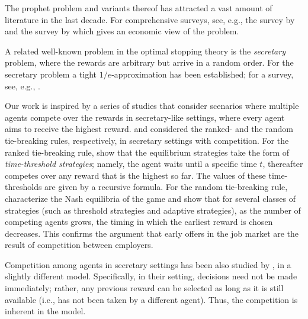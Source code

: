 The prophet problem and variants thereof has attracted a vast amount of literature in the last decade. For comprehensive surveys, see, e.g., the survey by %
\citet{hill1992survey} and the survey by %
\citet{lucier2017economic} which gives an economic view of the problem. 

A related well-known problem in the optimal stopping theory is the {\em secretary} problem, where the rewards are arbitrary but arrive in a random order. For the secretary problem a tight $1/e$-approximation has been established; for a survey, see, e.g., \cite{Ferguson89whosolved}.

Our work is inspired by a series of studies that consider scenarios where multiple agents compete over the rewards in secretary-like settings, where every agent aims to receive the highest reward.
\citet{karlin2015competitive} and \citet{immorlica2006secretary} considered the ranked- and the random tie-breaking rules, respectively, in secretary settings with competition.
For the ranked tie-breaking rule, \citet{karlin2015competitive} show that the equilibrium strategies take the form of {\em time-threshold strategies}; namely, the agent waits until a specific time $t$, thereafter competes over any reward that is the highest so far. The values of these time-thresholds are given by a recursive formula.
For the random tie-breaking rule, \citet{immorlica2006secretary} characterize the  Nash equilibria of the game and show that for several classes of strategies (such as threshold strategies and adaptive strategies), as the number of competing agents grows, the timing in which the earliest reward is chosen decreases. This confirms the argument that early offers in the job market are the result of competition between employers.

Competition among agents in secretary settings has been also studied by \citet{ezra2020competitive}, in a slightly different model. 
Specifically, in their setting, decisions need not be made immediately; rather, any previous reward can be selected as long as it is still available (i.e., has not been taken by a different agent). Thus, the competition is inherent in the model.

